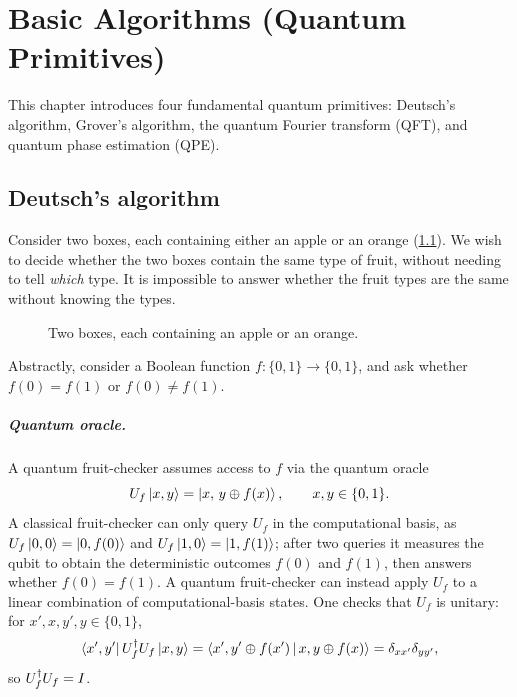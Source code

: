 \chapter{Basic Algorithms (Quantum Primitives)}\label{ch:sec02}

This chapter introduces four fundamental quantum primitives: Deutsch's
algorithm, Grover's algorithm, the quantum Fourier transform (QFT), and quantum
phase estimation (QPE).

\section{Deutsch's algorithm}\label{sec:sec02-deutsch}

Consider two boxes, each containing either an apple or an orange
(\cref{fig:sec02-boxes}). We wish to decide whether the two boxes contain the
same type of fruit, without needing to tell \emph{which} type. It is impossible
to answer whether the fruit types are the same without knowing the types.

\begin{figure}[ht]
  \centering
  \caption{Two boxes, each containing an apple or an orange.}
  \label{fig:sec02-boxes}
\end{figure}

Abstractly, consider a Boolean function $f : \{0,1\} \to \{0,1\}$, and ask
whether $f(0) = f(1)$ or $f(0) \neq f(1)$.

\paragraph{Quantum oracle.}
A quantum fruit-checker assumes access to $f$ via the quantum oracle
\begin{equation}
  U_f\ket{x, y} = \ket{x,\, y \oplus f(x)}, \qquad x, y \in \{0,1\}.
\end{equation}
A classical fruit-checker can only query $U_f$ in the computational basis, as
$U_f\ket{0,0} = \ket{0, f(0)}$ and $U_f\ket{1,0} = \ket{1, f(1)}$; after two
queries it measures the qubit to obtain the deterministic outcomes $f(0)$ and
$f(1)$, then answers whether $f(0) = f(1)$. A quantum fruit-checker can instead
apply $U_f$ to a linear combination of computational-basis states. One checks
that $U_f$ is unitary: for $x', x, y', y \in \{0,1\}$,
\begin{equation}
  \bra{x', y'} U_f^{\dagger} U_f \ket{x, y}
  = \braket{x', y' \oplus f(x') \,|\, x, y \oplus f(x)}
  = \delta_{x x'}\delta_{y y'},
\end{equation}
so $U_f^{\dagger} U_f = I$.

